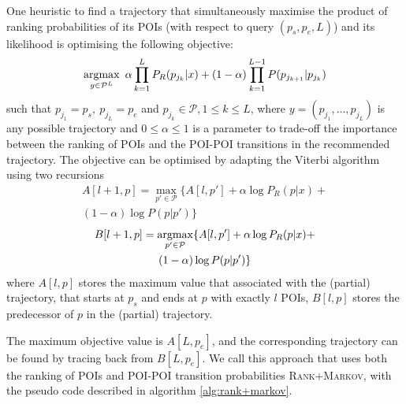 One heuristic to find a trajectory that simultaneously maximise the product of ranking probabilities
of its POIs (with respect to query $(p_s, p_e, L)$) and its likelihood is optimising the following objective:
\begin{equation*}
    \operatorname*{argmax}_{y \in \mathcal{P}^L} ~\alpha \prod_{k=1}^{L} P_R(p_{j_k} | x) +
                                    (1-\alpha) \prod_{k=1}^{L-1} P(p_{j_{k+1}} | p_{j_k})
\end{equation*}
such that
$p_{j_1} = p_s, ~ p_{j_L} = p_e$ and
$p_{j_k} \in \mathcal{P}, 1 \le k \le L$,
where $y = (p_{j_1}, \dots, p_{j_L})$ is any possible trajectory and
$0 \le \alpha \le 1$ is a parameter to trade-off the importance between the ranking of POIs
and the POI-POI transitions in the recommended trajectory.
The objective can be optimised by adapting the Viterbi algorithm using two recursions
\begin{multline}
    \label{eq:max}
    A[l+1, p] = \max_{p' \in \mathcal{P}} \{ A[l, p'] + \alpha \log P_R(p|x) + \\ (1-\alpha) \log P(p|p') \}
\end{multline}
\begin{multline}
    \label{eq:argmax}
    B[l+1, p] = \operatorname*{argmax}_{p' \in \mathcal{P}} \{ A[l, p'] + \alpha \log P_R(p|x) + \\ (1-\alpha) \log P(p|p') \}
\end{multline}
where $A[l, p]$ stores the maximum value that associated with the (partial) trajectory, 
that starts at $p_s$ and ends at $p$ with exactly $l$ POIs,
$B[l, p]$ stores the predecessor of $p$ in the (partial) trajectory.

The maximum objective value is $A[L, p_e]$,
and the corresponding trajectory can be found by tracing back from $B[L, p_e]$.
We call this approach that uses both the ranking of POIs and POI-POI transition probabilities
\textsc{Rank+Markov}, with the pseudo code described in algorithm \ref{alg:rank+markov}.

